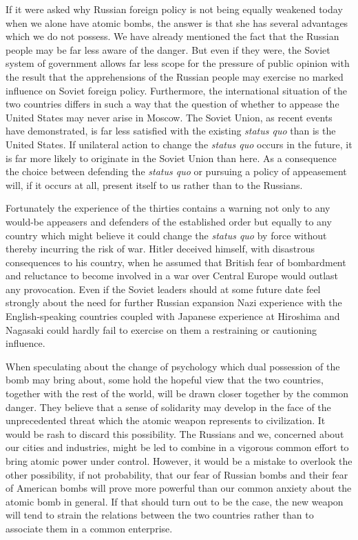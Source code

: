 If it were asked why Russian foreign policy is not being equally weakened today when we alone have atomic bombs, the answer is that she has several advantages which we do not possess. We have already mentioned the fact that the Russian people may be far less aware of the danger. But even if they were, the Soviet system of government allows far less scope for the pressure of public opinion with the result that the apprehensions of the Russian people may exercise no marked influence on Soviet foreign policy. Furthermore, the international situation of the two countries differs in such a way that the question of whether to appease the United States may never arise in Moscow. The Soviet Union, as recent events have demonstrated, is far less satisfied with the existing \emph{status quo} than is the United States. If unilateral action to change the \emph{status quo} occurs in the future, it is far more likely to originate in the Soviet Union than here. As a consequence the choice between defending the \emph{status quo} or pursuing a policy of appeasement will, if it occurs at all, present itself to us rather than to the Russians.

Fortunately the experience of the thirties contains a warning not only to any would-be appeasers and defenders of the established order but equally to any country which might believe it could change the \emph{status quo} by force without thereby incurring the risk of war. Hitler deceived himself, with disastrous consequences to his country, when he assumed that British fear of bombardment and reluctance to become involved in a war over Central Europe would outlast any provocation. Even if the Soviet leaders should at some future date feel strongly about the need for further Russian expansion Nazi experience with the English-speaking countries coupled with Japanese experience at Hiroshima and Nagasaki could hardly fail to exercise on them a restraining or cautioning influence.

When speculating about the change of psychology which dual possession of the bomb may bring about, some hold the hopeful view that the two countries, together with the rest of the world, will be drawn closer together by the common danger. They believe that a sense of solidarity may develop in the face of the unprecedented threat which the atomic weapon represents to civilization. It would be rash to discard this possibility. The Russians and we, concerned about our cities and industries, might be led to combine in a vigorous common effort to bring atomic power under control. However, it would be a mistake to overlook the other possibility, if not probability, that our fear of Russian bombs and their fear of American bombs will prove more powerful than our common anxiety about the atomic bomb in general. If that should turn out to be the case, the new weapon will tend to strain the relations between the two countries rather than to associate them in a common enterprise.


